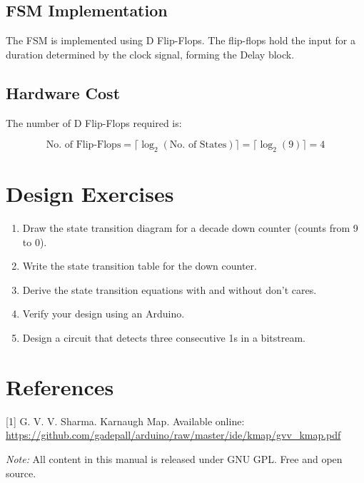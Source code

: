 \documentclass[12pt]{article}
\begin{document}
\subsection*{FSM Implementation}
The FSM is implemented using D Flip-Flops. The flip-flops hold the input for a duration determined by the clock signal, forming the Delay block.

\subsection*{Hardware Cost}
The number of D Flip-Flops required is:


\[
\text{No. of Flip-Flops} = \lceil \log_2(\text{No. of States}) \rceil = \lceil \log_2(9) \rceil = 4
\]



\section{Design Exercises}
\begin{enumerate}
  \item Draw the state transition diagram for a decade down counter (counts from 9 to 0).
  \item Write the state transition table for the down counter.
  \item Derive the state transition equations with and without don't cares.
  \item Verify your design using an Arduino.
  \item Design a circuit that detects three consecutive 1s in a bitstream.
\end{enumerate}

\section*{References}
[1] G. V. V. Sharma. Karnaugh Map. Available online:  
\url{https://github.com/gadepall/arduino/raw/master/ide/kmap/gvv_kmap.pdf}

\vspace{1em}
\noindent\textit{Note:} All content in this manual is released under GNU GPL. Free and open source.
\end{document}
